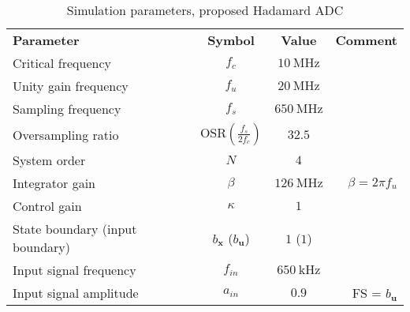 
\begin{table}[htbp]
    \centering
    \caption{Simulation parameters, proposed Hadamard ADC}
      \begin{tabular}{lccr}
      \rowcolor[rgb]{ 0,  0,  0} \textcolor[rgb]{ 1,  1,  1}{\textbf{Parameter}}	 & \textcolor[rgb]{ 1,  1,  1}{\textbf{Symbol}}
                               & \textcolor[rgb]{ 1,  1,  1}{\textbf{Value}} & \textcolor[rgb]{ 1,  1,  1}{\textbf{Comment}}          \\
      Critical frequency       & $f_c$            & $\SI{10}{\mega\hertz}$          &                                                  \\
      Unity gain frequency     & $f_u$            & $\SI{20}{\mega\hertz}$          &                                                  \\
      Sampling frequency       & $f_s$            & $\SI{650}{\mega\hertz}$         &                                                  \\
      Oversampling ratio       & $\text{OSR} \left( \frac{f_s}{2f_c} \right)$       & $32.5$                                            \\
      System order             & $N$              & $4$                             &                                                   \\
      Integrator gain          & $\beta$          & $\SI{126}{\mega\hertz}$         & $\beta = 2\pi f_u$                                \\
      Control gain             & $\kappa$         & $1$                             &                                                    \\
      State boundary (input boundary)  & $b_{\bm{x}}$ ($b_{\bm{u}}$)    & $1$ ($1$) &                                                    \\
      Input signal frequency   & $f_{in}$         & $\SI{650}{\kilo\hertz}$         &                                                       \\
      Input signal amplitude   & $a_{in}$         & $0.9$                           & FS = $b_{\bm{u}}$

      \end{tabular}
    \label{tab:HCI_params}
  \end{table}
